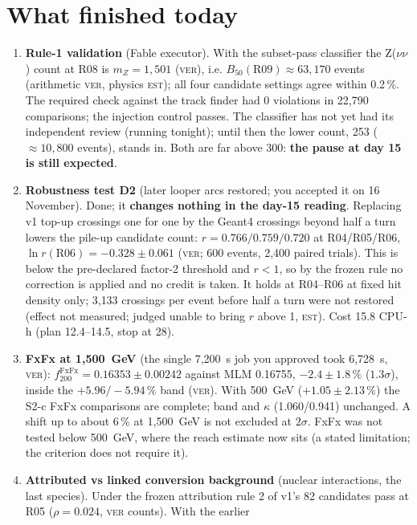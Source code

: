 \documentclass[11pt,a4paper]{article}
\newcommand{\est}{\textsc{est}}
\newcommand{\ver}{\textsc{ver}}
\begin{document}
\section{What finished today}
\begin{enumerate}
\item \textbf{Rule-1 validation} (Fable executor). With the subset-pass classifier the Z($\nu\nu$) count at R08 is
      $m_Z=1{,}501$ (\ver), i.e. $B_{50}(\mathrm{R09})\approx63{,}170$ events (arithmetic \ver, physics \est);
      all four candidate settings agree within 0.2\,\%. The required check against the track finder had
      0 violations in 22{,}790 comparisons; the injection control passes. The classifier has not yet had its
      independent review (running tonight); until then the lower count, 253 ($\approx10{,}800$ events), stands in.
      Both are far above 300: \textbf{the pause at day 15 is still expected}.
\item \textbf{Robustness test D2} (later looper arcs restored; you accepted it on 16 November). Done; it
      \textbf{changes nothing in the day-15 reading}. Replacing v1 top-up crossings one for one by the Geant4
      crossings beyond half a turn lowers the pile-up candidate count: $r=0.766/0.759/0.720$ at R04/R05/R06,
      $\ln r(\mathrm{R06})=-0.328\pm0.061$ (\ver; 600 events, 2{,}400 paired trials). This is below the
      pre-declared factor-2 threshold and $r<1$, so by the frozen rule no correction is applied and no credit is
      taken. It holds at R04--R06 at fixed hit density only; 3{,}133 crossings per event before half a turn were
      not restored (effect not measured; judged unable to bring $r$ above 1, \est). Cost 15.8 CPU-h (plan
      12.4--14.5, stop at 28).
\item \textbf{FxFx at 1{,}500~GeV} (the single 7{,}200~s job you approved took 6{,}728~s, \ver):
      $f_{200}^{\mathrm{FxFx}}=0.16353\pm0.00242$ against MLM 0.16755, $-2.4\pm1.8\,\%$ ($1.3\sigma$), inside the
      $+5.96/-5.94\,\%$ band (\ver). With 500~GeV ($+1.05\pm2.13\,\%$) the S2-c FxFx comparisons are complete;
      band and $\kappa$ (1.060/0.941) unchanged. A shift up to about 6\,\% at 1{,}500~GeV is not excluded at
      $2\sigma$. FxFx was not tested below 500~GeV, where the reach estimate now sits (a stated limitation; the
      criterion does not require it).
\item \textbf{Attributed vs linked conversion background} (nuclear interactions, the last species). Under the
      frozen attribution rule 2 of v1's 82 candidates pass at R05 ($\rho=0.024$, \ver{} counts). With the earlier

\end{enumerate}
\end{document}
